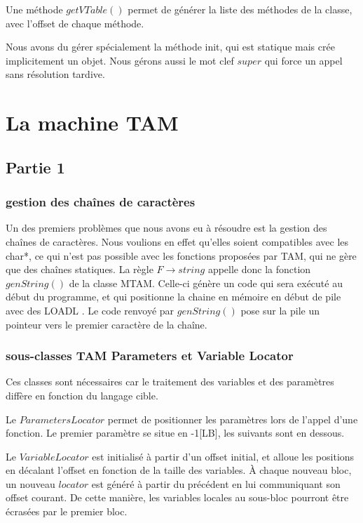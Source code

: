 \documentclass{scrartcl}
\begin{document}
Une méthode $getVTable()$ permet de générer la liste des méthodes de la classe,
avec l'offset de chaque méthode.

Nous avons du gérer spécialement la méthode init, qui est statique mais crée implicitement un objet.
Nous gérons aussi le mot clef $super$ qui force un appel sans résolution tardive.

\section{La machine TAM}

\subsection{Partie 1}

\subsubsection{gestion des chaînes de caractères}

Un des premiers problèmes que nous avons eu à résoudre est la gestion des chaînes de caractères.
Nous voulions en effet qu'elles soient compatibles avec les char*, ce qui n'est pas possible 
avec les fonctions proposées par TAM, qui ne gère que des chaînes statiques.
La règle $F \rightarrow string$ appelle donc la  fonction $genString()$ de la classe MTAM.
Celle-ci génère un code qui sera exécuté au début du programme, et qui positionne la chaine en mémoire
en début de pile avec des LOADL . Le code renvoyé par $genString()$ pose sur la pile un pointeur vers le
premier caractère de la chaîne.

\subsubsection{sous-classes TAM Parameters et Variable Locator}

Ces classes sont nécessaires car le traitement des variables et des paramètres diffère en fonction du langage cible.

Le $ParametersLocator$ permet de positionner les paramètres lors de l'appel d'une fonction. Le premier paramètre se situe en -1[LB],
les suivants sont en dessous.

Le $VariableLocator$ est initialisé à partir d'un offset initial, et alloue les positions en décalant l'offset en fonction de la taille des variables.
À chaque nouveau bloc, un nouveau $locator$ est généré à partir du précédent en lui communiquant son offset courant. De cette manière, les variables locales
au sous-bloc pourront être écrasées par le premier bloc.
 
\end{document}
